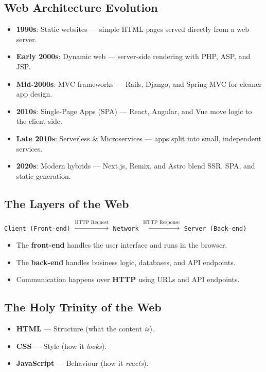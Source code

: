 \documentclass[hidelinks]{article}
\begin{document}
\subsection{Web Architecture Evolution}
\begin{itemize}
  \item \textbf{1990s}: Static websites --- simple HTML pages served directly from a web server.
  \item \textbf{Early 2000s}: Dynamic web --- server-side rendering with PHP, ASP, and JSP.
  \item \textbf{Mid-2000s}: MVC frameworks --- Rails, Django, and Spring MVC for cleaner app design.
  \item \textbf{2010s}: Single-Page Apps (SPA) --- React, Angular, and Vue move logic to the client side.
  \item \textbf{Late 2010s}: Serverless \& Microservices --- apps split into small, independent services.
  \item \textbf{2020s}: Modern hybrids --- Next.js, Remix, and Astro blend SSR, SPA, and static generation.
\end{itemize}

\subsection{The Layers of the Web}
\begin{center}
  \texttt{Client (Front-end)} $\xrightarrow{\text{HTTP Request}}$ \texttt{Network} $\xrightarrow{\text{HTTP Response}}$ \texttt{Server (Back-end)}
\end{center}
\begin{itemize}
  \item The \textbf{front-end} handles the user interface and runs in the browser.
  \item The \textbf{back-end} handles business logic, databases, and API endpoints.
  \item Communication happens over \textbf{HTTP} using URLs and API endpoints.
\end{itemize}

\subsection{The Holy Trinity of the Web}
\begin{itemize}
  \item \textbf{HTML} --- Structure (what the content \emph{is}).
  \item \textbf{CSS} --- Style (how it \emph{looks}).
  \item \textbf{JavaScript} --- Behaviour (how it \emph{reacts}).
\end{itemize}
\end{document}
